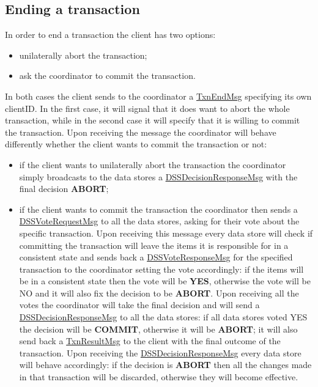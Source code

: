\subsection{Ending a transaction}
In order to end a transaction the client has two options:
\begin{itemize}
    \item unilaterally abort the transaction;
    \item ask the coordinator to commit the transaction.
\end{itemize}
In both cases the client sends to the coordinator a \url{TxnEndMsg} specifying its own clientID. In the first case, it will signal that it does want to abort the whole transaction, while in the second case it will specify that it is willing to commit the transaction.
\newline
Upon receiving the message the coordinator will behave differently whether the client wants to commit the transaction or not:
\begin{itemize}
    \item if the client wants to unilaterally abort the transaction the coordinator simply broadcasts to the data stores a \url{DSSDecisionResponseMsg} with the final decision \textbf{ABORT};
    \item if the client wants to commit the transaction the coordinator then sends a \url{DSSVoteRequestMsg} to all the data stores, asking for their vote about the specific transaction. Upon receiving this message every data store will check if committing the transaction will leave the items it is responsible for in a consistent state and sends back a \url{DSSVoteResponseMsg} for the specified transaction to the coordinator setting the vote accordingly: if the items will be in a consistent state then the vote will be \textbf{YES}, otherwise the vote will be NO and it will also fix the decision to be \textbf{ABORT}. Upon receiving all the votes the coordinator will take the final decision and will send a \url{DSSDecisionResponseMsg} to all the data stores: if all data stores voted YES the decision will be \textbf{COMMIT}, otherwise it will be \textbf{ABORT}; it will also send back a \url{TxnResultMsg} to the client with the final outcome of the transaction. Upon receiving the \url{DSSDecisionResponseMsg} every data store will behave accordingly: if the decision is \textbf{ABORT} then all the changes made in that transaction will be discarded, otherwise they will become effective.
\end{itemize}


